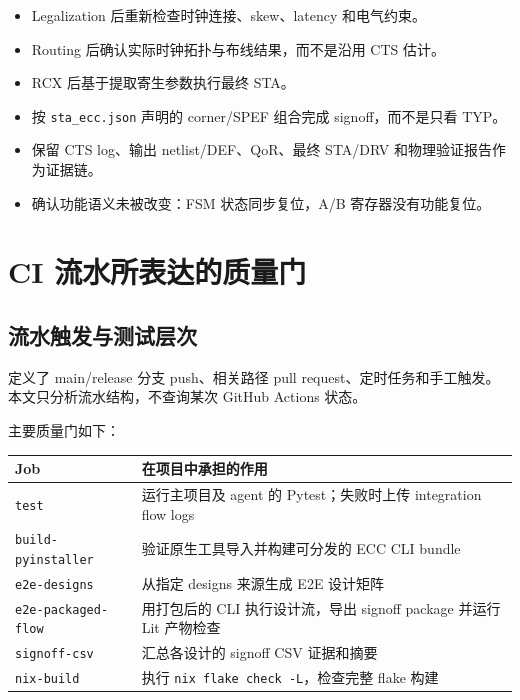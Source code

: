 \documentclass[UTF8,a4paper,11pt,fontset=fandol]{ctexart}
\newcommand{\code}[1]{\nolinkurl{#1}}
\begin{document}
\begin{itemize}[leftmargin=2em]
  \item[$\square$] Legalization 后重新检查时钟连接、skew、latency 和电气约束。
  \item[$\square$] Routing 后确认实际时钟拓扑与布线结果，而不是沿用 CTS 估计。
  \item[$\square$] RCX 后基于提取寄生参数执行最终 STA。
  \item[$\square$] 按 \code{sta_ecc.json} 声明的 corner/SPEF 组合完成 signoff，而不是只看 TYP。
  \item[$\square$] 保留 CTS log、输出 netlist/DEF、QoR、最终 STA/DRV 和物理验证报告作为证据链。
  \item[$\square$] 确认功能语义未被改变：FSM 状态同步复位，A/B 寄存器没有功能复位。
\end{itemize}

\section{CI 流水所表达的质量门}

\subsection{流水触发与测试层次}

 定义了 main/release 分支 push、相关路径 pull request、定时任务和手工触发。本文只分析流水结构，不查询某次 GitHub Actions 状态。

主要质量门如下：
\begin{center}
\begin{tabularx}{\textwidth}{p{}X}
\toprule
Job & 在项目中承担的作用 \\
\midrule
\code{test} & 运行主项目及 agent 的 Pytest；失败时上传 integration flow logs \\
\code{build-pyinstaller} & 验证原生工具导入并构建可分发的 ECC CLI bundle \\
\code{e2e-designs} & 从指定 designs 来源生成 E2E 设计矩阵 \\
\code{e2e-packaged-flow} & 用打包后的 CLI 执行设计流，导出 signoff package 并运行 Lit 产物检查 \\
\code{signoff-csv} & 汇总各设计的 signoff CSV 证据和摘要 \\
\code{nix-build} & 执行 \code{nix flake check -L}，检查完整 flake 构建 \\
\bottomrule
\end{tabularx}
\end{center}
\end{document}
